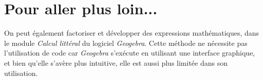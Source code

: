 

\section{Pour aller plus loin...}

On peut également factoriser et développer des expressions mathématiques, dans le module \emph{Calcul littéral} du logiciel \emph{Geogebra}. Cette méthode ne nécessite pas l'utilisation de code car \emph{Geogebra} s'exécute en utilisant une interface graphique, et bien qu'elle s'avère plus intuitive, elle est aussi plus limitée dans son utilisation.








